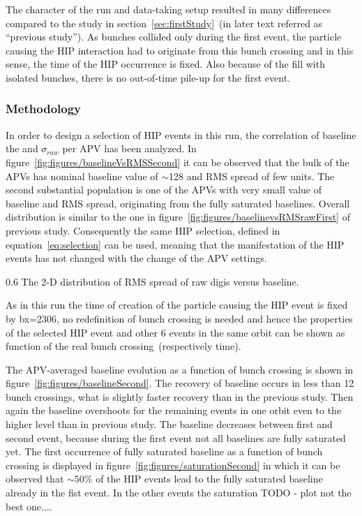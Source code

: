 The character of the run and data-taking setup resulted in many differences compared to the study in section~\ref{sec:firstStudy}~(in later text referred as ``previous study''). As bunches collided only during the first event, the particle causing the HIP interaction had to originate from this bunch crossing and in this sense, the time of the HIP occurrence is fixed. Also because of the fill with isolated bunches, there is no out-of-time pile-up for the first event.

\subsubsection{Methodology}

In order to design a selection of HIP events in this run, the correlation of baseline the and $\sigma_{raw}$ per APV has been analyzed. In figure~\ref{fig:figures/baselineVsRMSSecond} it can be observed that the bulk of the APVs has nominal baseline value of $\sim$128 and RMS spread of few units. The second substantial population is one of the APVs with very small value of baseline and RMS spread, originating from the fully saturated baselines. Overall distribution is similar to the one in figure~\ref{fig:figures/baselinevsRMSrawFirst} of previous study. Consequently the same HIP selection, defined in equation~\ref{eq:selection} can be used, meaning that the manifestation of the HIP events has not changed with the change of the APV settings.

                 {0.6}       %
                 {The 2-D distribution of RMS spread of raw digis versus baseline. } %

As in this run the time of creation of the particle causing the HIP event is fixed by bx=2306, no redefinition of bunch crossing is needed and hence the properties of the selected HIP event and other 6 events in the same orbit can be shown as function of the real bunch crossing~(respectively time).

The APV-averaged baseline evolution as a function of bunch crossing is shown in figure~\ref{fig:figures/baselineSecond}. The recovery of baseline occurs in less than 12 bunch crossings, what is slightly faster recovery than in the previous study. Then again the baseline overshoots for the remaining events in one orbit even to the higher level than in previous study. The baseline decreases between first and second event, because during the first event not all baselines are fully saturated yet. The first occurrence of fully saturated baseline as a function of bunch crossing is displayed in figure~\ref{fig:figures/saturationSecond} in which it can be observed that $\sim 50\%$ of the HIP events lead to the fully saturated baseline already in the fist event. In the other events the saturation TODO - plot not the best one....

